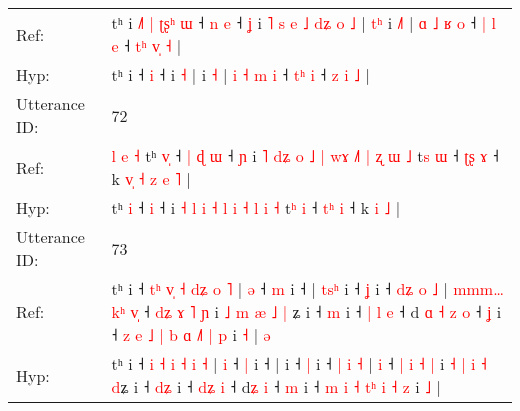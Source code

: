 \documentclass[10pt]{article}
\DeclareRobustCommand{\hl}[1]{{\textcolor{red}{#1}}}
\begin{document}
\begin{longtable}{ll}
Ref: & tʰ i\hl{ }\hl{˩}\hl{˥}\hl{ }\hl{|}\hl{ }\hl{ʈ}\hl{ʂ}\hl{ʰ}\hl{ }\hl{ɯ} ˧\hl{ }\hl{n} \hl{e} ˧\hl{ }\hl{ʝ} i\hl{ }\hl{˥}\hl{ }\hl{s}\hl{ }\hl{e}\hl{ }\hl{˩}\hl{ }\hl{d}\hl{ʑ}\hl{ }\hl{o} \hl{˩} |\hl{ }\hl{t}\hl{ʰ} i \hl{˩}\hl{˥} | \hl{ɑ} \hl{˩} \hl{ʁ} \hl{o} ˧ \hl{|}\hl{ }\hl{l} \hl{e} ˧ \hl{t}\hl{ʰ} \hl{v}\hl{̩} \hl{˧} |
 \\
Hyp: & tʰ i\hl{}\hl{}\hl{}\hl{}\hl{}\hl{}\hl{}\hl{}\hl{}\hl{}\hl{} ˧\hl{}\hl{} \hl{i} ˧\hl{}\hl{} i\hl{}\hl{}\hl{}\hl{}\hl{}\hl{}\hl{}\hl{}\hl{}\hl{}\hl{}\hl{}\hl{} \hl{˧} |\hl{}\hl{}\hl{} i \hl{}\hl{˧} | \hl{i} \hl{˧} \hl{m} \hl{i} ˧ \hl{}\hl{t}\hl{ʰ} \hl{i} ˧ \hl{}\hl{z} \hl{}\hl{i} \hl{˩} |
 \\
\midrule
Utterance ID: & 72 \\
Ref: & \hl{l}\hl{ }\hl{e}\hl{ }\hl{˧}\hl{ }tʰ \hl{v}\hl{̩} ˧\hl{ }\hl{|}\hl{ }\hl{ɖ} \hl{ɯ} ˧\hl{ }\hl{ɲ} i\hl{ }\hl{˥} \hl{d}\hl{ʑ} \hl{o} \hl{˩} \hl{|} \hl{w}\hl{ɤ} \hl{˩}\hl{˥} \hl{|} \hl{ʐ} \hl{ɯ} \hl{˩} t\hl{s} \hl{ɯ} ˧ \hl{ʈ}\hl{ʂ} \hl{ɤ} ˧ k\hl{ }\hl{v}\hl{̩}\hl{ }\hl{˧}\hl{ }\hl{z} \hl{e} \hl{˥} |
 \\
Hyp: & \hl{}\hl{}\hl{}\hl{}\hl{}\hl{}tʰ \hl{}\hl{i} ˧\hl{}\hl{}\hl{}\hl{} \hl{i} ˧\hl{}\hl{} i\hl{}\hl{} \hl{}\hl{˧} \hl{l} \hl{i} \hl{˧} \hl{}\hl{l} \hl{}\hl{i} \hl{˧} \hl{l} \hl{i} \hl{˧} t\hl{ʰ} \hl{i} ˧ \hl{t}\hl{ʰ} \hl{i} ˧ k\hl{}\hl{}\hl{}\hl{}\hl{}\hl{}\hl{} \hl{i} \hl{˩} |
 \\
\midrule
Utterance ID: & 73 \\
Ref: & tʰ i ˧ \hl{t}\hl{ʰ} \hl{v}\hl{̩} \hl{˧} \hl{d}\hl{ʑ} \hl{o} \hl{˥} | \hl{ə} ˧ \hl{m} i ˧ |\hl{ }\hl{t}\hl{s}\hl{ʰ} i ˧ \hl{ʝ} i ˧ \hl{d}\hl{ʑ} \hl{o} \hl{˩} |\hl{ }\hl{m}\hl{m}\hl{m}\hl{…}\hl{ }\hl{k}\hl{ʰ} \hl{v}\hl{̩} ˧ \hl{d}\hl{ʑ} \hl{ɤ} \hl{˥} \hl{ɲ} i \hl{˩} \hl{m} \hl{æ} \hl{˩} \hl{|}\hl{ }ʑ i ˧ \hl{}\hl{m} i ˧ \hl{|}\hl{ }\hl{l} \hl{e} ˧ d\hl{ }\hl{ɑ}\hl{ }\hl{˧}\hl{ }\hl{z} \hl{o} ˧ \hl{ʝ} i ˧\hl{ }\hl{z} \hl{e} \hl{˩} \hl{|} \hl{b}\hl{ }\hl{ɑ} \hl{˩}\hl{˥} \hl{|} \hl{p} i \hl{˧} |\hl{ }\hl{ə}
 \\
Hyp: & tʰ i ˧ \hl{}\hl{i} \hl{}\hl{˧} \hl{i} \hl{}\hl{˧} \hl{i} \hl{˧} | \hl{i} ˧ \hl{|} i ˧ |\hl{}\hl{}\hl{}\hl{} i ˧ \hl{|} i ˧ \hl{}\hl{|} \hl{i} \hl{˧} |\hl{}\hl{}\hl{}\hl{}\hl{}\hl{}\hl{}\hl{} \hl{}\hl{i} ˧ \hl{}\hl{|} \hl{i} \hl{˧} \hl{|} i \hl{˧} \hl{|} \hl{i} \hl{˧} \hl{}\hl{d}ʑ i ˧ \hl{d}\hl{ʑ} i ˧ \hl{}\hl{d}\hl{ʑ} \hl{i} ˧ d\hl{}\hl{}\hl{}\hl{}\hl{}\hl{ʑ} \hl{i} ˧ \hl{m} i ˧\hl{}\hl{} \hl{m} \hl{i} \hl{˧} \hl{}\hl{t}\hl{ʰ} \hl{}\hl{i} \hl{˧} \hl{z} i \hl{˩} |\hl{}\hl{}
 \\

\end{longtable}
\end{document}
